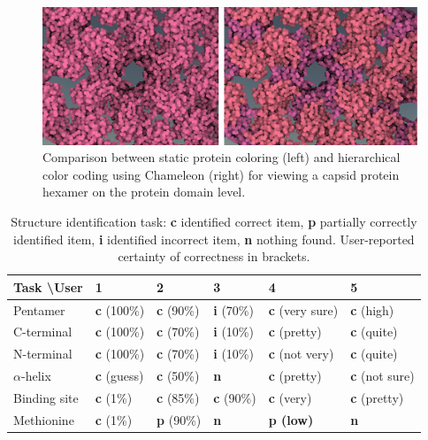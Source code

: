 \documentclass{egpubl}
\begin{document}
	
	
	\begin{figure}
		\centering
		\includegraphics[width=1\linewidth]{Figures/comparison}
		\caption{Comparison between static protein coloring (left) and hierarchical color coding using Chameleon (right) for viewing a capsid protein hexamer on the protein domain level. }
		\label{fig:comparison}
	\end{figure}
	
	
	
\begin{table}
	 	
	 	\centering
	 	\caption{Structure identification task: \textbf{\color{cc}c} identified correct item, \textbf{\color{cp}p} partially correctly identified item, \textbf{\color{ci}i} identified incorrect item, \textbf{\color{cn}n} nothing found. User-reported certainty of correctness in brackets. }
	 	{\scriptsize \begin{tabular}{ l l l l l l }
	 		\toprule
	 		Task \textbackslash User & 1 & 2 & 3 & 4 & 5 \\
	 		\midrule
	 		Pentamer       & \textbf{\color{cc}c} (100\%) 	& \textbf{\color{cc}c} (90\%) 	& \textbf{\color{ci}i} (70\%) 	& \textbf{\color{cc}c} (very sure) 		& \textbf{\color{cc}c} (high)\\
	 		C-terminal     & \textbf{\color{cc}c} (100\%) 	& \textbf{\color{cc}c} (70\%) 	& \textbf{\color{ci}i} (10\%) 		& \textbf{\color{cc}c} (pretty) 	& \textbf{\color{cc}c} (quite) \\
	 		N-terminal     & \textbf{\color{cc}c} (100\%) 	& \textbf{\color{cc}c} (70\%) 	& \textbf{\color{ci}i} (10\%) 		& \textbf{\color{cc}c} (not very) 	& \textbf{\color{cc}c} (quite)\\
	 		$\alpha$-helix & \textbf{\color{cc}c} (guess) 	& \textbf{\color{cc}c} (50\%) 	& \textbf{\color{cn}n} 		& \textbf{\color{cc}c} (pretty) 	& \textbf{\color{cc}c} (not sure) \\
	 		Binding site   & \textbf{\color{cc}c} (1\%) 	& \textbf{\color{cc}c} (85\%) 	& \textbf{\color{cc}c} (90\%) 	& \textbf{\color{cc}c} (very) 		& \textbf{\color{cc}c} (pretty) \\
	 		Methionine      & \textbf{\color{cc}c} (1\%) 	& \textbf{\color{cp}p} (90\%) 	& \textbf{\color{cn}n} 		& \textbf{\color{cp}p (low)} 			& \textbf{\color{cn}n}  \\
	 		\bottomrule
	 	\end{tabular}}
	 	
	 	\label{table:identification}
	 \end{table}
	 
\end{document}
